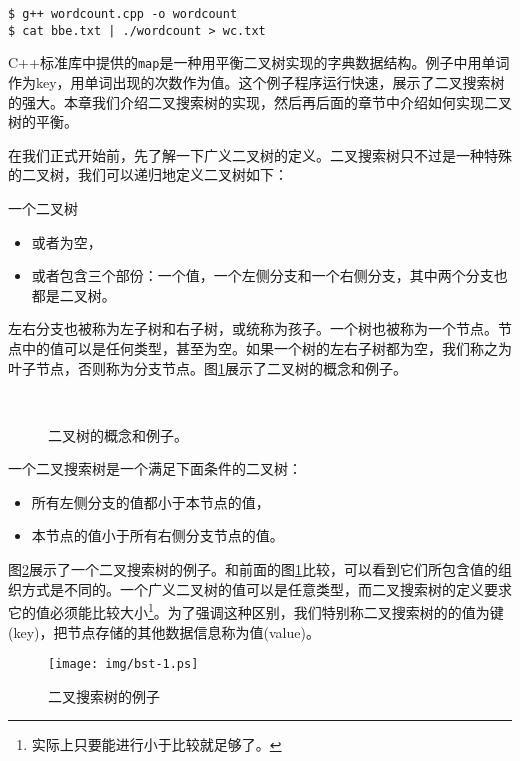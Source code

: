 \documentclass[UTF8]{article}
\begin{document}
\begin{verbatim}
$ g++ wordcount.cpp -o wordcount
$ cat bbe.txt | ./wordcount > wc.txt
\end{verbatim}

C++标准库中提供的\texttt{map}是一种用平衡二叉树实现的字典数据结构。例子中用单词作为key，用单词出现的次数作为值。这个例子程序运行快速，展示了二叉搜索树的强大。本章我们介绍二叉搜索树的实现，然后再后面的章节中介绍如何实现二叉树的平衡。

在我们正式开始前，先了解一下广义二叉树的定义。二叉搜索树只不过是一种特殊的二叉树，我们可以递归地定义二叉树如下：

一个二叉树
\begin{itemize}
\item 或者为空，
\item 或者包含三个部份：一个值，一个左侧分支和一个右侧分支，其中两个分支也都是二叉树。
\end{itemize}

左右分支也被称为左子树和右子树，或统称为孩子。一个树也被称为一个节点。节点中的值可以是任何类型，甚至为空。如果一个树的左右子树都为空，我们称之为叶子节点，否则称为分支节点。图\ref{fig:binary-tree-example}展示了二叉树的概念和例子。

\begin{figure}[htbp]
  \centering
   \\
  \caption{二叉树的概念和例子。}
  \label{fig:binary-tree-example}
\end{figure}

一个二叉搜索树是一个满足下面条件的二叉树：
\begin{itemize}
\item 所有左侧分支的值都小于本节点的值，
\item 本节点的值小于所有右侧分支节点的值。
\end{itemize}

图\ref{fig:bst-example}展示了一个二叉搜索树的例子。和前面的图\ref{fig:binary-tree-example}比较，可以看到它们所包含值的组织方式是不同的。一个广义二叉树的值可以是任意类型，而二叉搜索树的定义要求它的值必须能比较大小\footnote{实际上只要能进行小于比较就足够了。}。为了强调这种区别，我们特别称二叉搜索树的的值为键(key)，把节点存储的其他数据信息称为值(value)。

\begin{figure}[htbp]
  \centering
  \texttt{[image: img/bst-1.ps]}
  \caption{二叉搜索树的例子} \label{fig:bst-example}
\end{figure}
\end{document}

